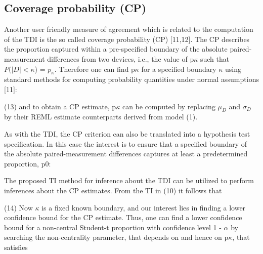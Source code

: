 \documentclass[MAIN.tex]{subfiles}
\begin{document}



	
	\subsection*{Coverage probability (CP)}
	Another user friendly measure of agreement which is related to the computation of the TDI is the so called coverage probability (CP) [11,12]. 
	The CP describes the proportion captured within a pre-specified boundary of the absolute paired-measurement differences from two devices, i.e., the value of p$\kappa$ such that $P(|D| < \kappa$) = $p_\kappa$. Therefore one can find p$\kappa$ for a specified boundary $\kappa$ using standard methods for computing probability quantities under normal assumptions [11]:
	
	(13)
	and to obtain a CP estimate, p$\kappa$ can be computed by replacing $\mu_D$ and $\sigma_D$ by their REML estimate counterparts derived from model (1).
	
	As with the TDI, the CP criterion can also be translated into a hypothesis test specification. 
	In this case the interest is to ensure that a specified boundary of the absolute paired-measurement differences captures at least a predetermined proportion, p0:
	
	
	The proposed TI method for inference about the TDI can be utilized to perform inferences about the CP estimates. From the TI in (10) it follows that
	
	(14)
	Now $\kappa$ is a fixed known boundary, and our interest lies in finding a lower confidence bound for the CP estimate. 
	Thus, one can find a lower confidence bound for a non-central Student-t proportion with confidence level 1 - $\alpha$ by searching the non-centrality parameter, 
	that depends on  and hence on p$\kappa$, that satisfies
	
\end{document}

